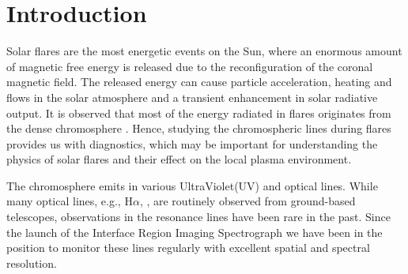 
    

\section{Introduction} \label{sec:intro}

Solar flares are the most energetic events on the Sun, where an enormous amount of magnetic free energy is released due to the reconfiguration of the coronal magnetic field. The released energy can cause particle acceleration, heating and flows in the solar atmosphere and a transient enhancement in solar radiative output. It is observed that most of the energy radiated in flares originates from the dense chromosphere \citep{fletcher10,milligan14}. Hence, studying the chromospheric lines during flares provides us with diagnostics, which may be important for understanding the physics of solar flares and their effect on the local plasma environment.

The chromosphere emits in various UltraViolet(UV) and optical lines. While many optical lines, e.g., H$\alpha$, , are routinely observed from ground-based telescopes, observations in the  resonance lines have been rare in the past. Since the launch of the Interface Region Imaging Spectrograph \citep[IRIS;][]{IRIS} we have been in the position to monitor these lines regularly with excellent spatial and spectral resolution.

